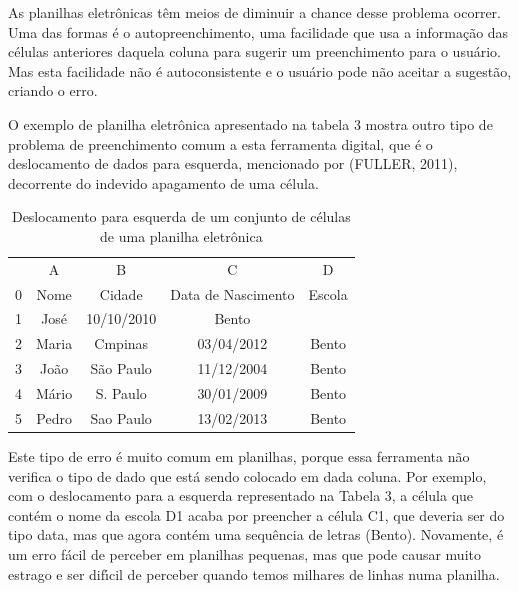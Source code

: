 \documentclass[
12pt,		%
openright,	%
twoside,  %
a4paper,			%
chapter=TITLE,		%
english,			%
french,				%
spanish,			%
brazil				%
]{USPSC-classe/USPSC}
\begin{document}
As planilhas eletr\^onicas t\^em meios de diminuir a chance desse problema ocorrer. Uma das formas \'e o autopreenchimento, uma facilidade que usa a informa\c{c}\~ao das c\'elulas anteriores daquela coluna para sugerir um preenchimento para o usu\'ario. Mas esta facilidade n\~ao \'e autoconsistente e o usu\'ario pode n\~ao aceitar a sugest\~ao, criando o erro.









O exemplo de planilha eletr\^onica apresentado na tabela 3 mostra outro tipo de problema de preenchimento comum a esta ferramenta digital, que \'e o deslocamento de dados para esquerda,  mencionado por (FULLER, 2011), decorrente do indevido apagamento de uma c\'elula.













\begin{table}[htb]
\tiny
\caption{\label{f6feaa39313aa0691b7fdadc84175a203e68bf77}Deslocamento para esquerda de um conjunto de c\'elulas de uma planilha eletr\^onica}

\centering
\begin{tabular}{|c|c|c|c|c|}
\hline
  &  A  &  B  &  C  &  D  \\
0 & Nome  &  Cidade  &  Data de Nascimento  &  Escola \\
1 & Jos\'e  &  10/10/2010  &  Bento  &   \\
2 & Maria  &  Cmpinas  &  03/04/2012  &  Bento \\
3 & Jo\~ao  &  S\~ao Paulo  &  11/12/2004  &  Bento \\
4 & M\'ario  &  S. Paulo  &  30/01/2009  &  Bento \\
5 & Pedro  &  Sao Paulo  &  13/02/2013  &  Bento \\
\hline
\end{tabular}
\end{table}


Este tipo de erro \'e muito comum em  planilhas, porque essa ferramenta n\~ao verifica o tipo de dado que est\'a sendo colocado em dada coluna. Por exemplo, com o deslocamento para a esquerda representado na Tabela 3, a c\'elula que cont\'em o nome da escola D1 acaba por preencher a c\'elula C1, que deveria ser do tipo data, mas que agora cont\'em uma sequ\^encia de letras (\textquotedbl Bento\textquotedbl ). Novamente, \'e um erro f\'acil de perceber em planilhas pequenas, mas que pode causar muito estrago e ser dif\'{\i}cil de perceber quando temos milhares de linhas numa planilha.
\end{document}

